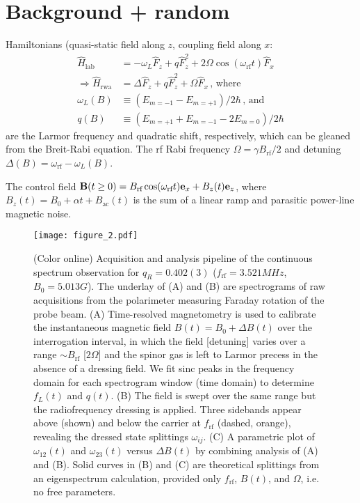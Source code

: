 \documentclass[aps,prl,reprint,superscriptaddress,floatfix]{revtex4-1}
\begin{document}
\section{Background + random}
\label{sec:background}
Hamiltonians (quasi-static field along $z$, coupling field along $x$:
    \begin{align*}
        \hat{H}_{\text{lab}} &= -\omega_L \hat{F}_z + q \hat{F}_z^2 + 2\Omega \cos (\omega_{\text{rf}} t) \hat{F}_x \\
        \Rightarrow \hat{H}_{\text{rwa}} &= \Delta \hat{F}_z + q \hat{F}_z^2 + \Omega \hat{F}_x \, \text{, where} \\
        \omega_L(B) &\equiv (E_{m=-1} - E_{m=+1})/2\hbar \, \text{, and} \\
        q(B) &\equiv (E_{m=+1} + E_{m=-1} - 2 E_{m=0})/2\hbar
    \end{align*}
are the Larmor frequency and quadratic shift, respectively, which can be gleaned from the Breit-Rabi equation.
The rf Rabi frequency $\Omega = \gamma B_{\text{rf}}/2$ and detuning $\Delta(B) = \omega_{\text{rf}} - \omega_L(B)$.

The control field $\mathbf{B}(t \geq 0) = B_{\text{rf}} \cos (\omega_{\text{rf}} t) \mathbf{e}_x + B_z(t) \mathbf{e}_z$, where $B_z(t) = B_0 + \alpha t + B_{\text{ac}}(t)$ is the sum of a linear ramp and parasitic power-line magnetic noise.

\begin{figure}
    \centering
    \texttt{[image: figure\_2.pdf]}
    \caption{
    \label{fig:acquisition_pipeline}
        (Color online)
        Acquisition and analysis pipeline of the continuous spectrum observation for $q_R = 0.402(3)$ ($f_{\text{rf}}=3.521\unit{MHz}$, $B_0=5.013\unit{G}$).
        The underlay of (A) and (B) are spectrograms of raw acquisitions from the polarimeter measuring Faraday rotation of the probe beam.
        (A) Time-resolved magnetometry is used to calibrate the instantaneous magnetic field $B(t) = B_0 + \Delta B(t)$ over the interrogation interval, in which the field [detuning] varies over a range $\sim B_{\text{rf}}$ [$2\Omega$] and the spinor gas is left to Larmor precess in the absence of a dressing field.
        We fit sinc peaks in the frequency domain for each spectrogram window (time domain) to determine $f_L(t)$ and $q(t)$.
       (B) The field is swept over the same range but the radiofrequency dressing is applied.
       Three sidebands appear above (shown) and below the carrier at $f_{\text{rf}}$ (dashed, orange), revealing the dressed state splittings $\omega_{ij}$.
       (C) A parametric plot of $\omega_{12}(t)$ and $\omega_{23}(t)$ versus $\Delta B(t)$ by combining analysis of (A) and (B).
       Solid curves in (B) and (C) are theoretical splittings from an eigenspectrum calculation, provided only $f_{\text{rf}}$, $B(t)$, and $\Omega$, i.e. no free parameters.
    }
\end{figure}
\end{document}
